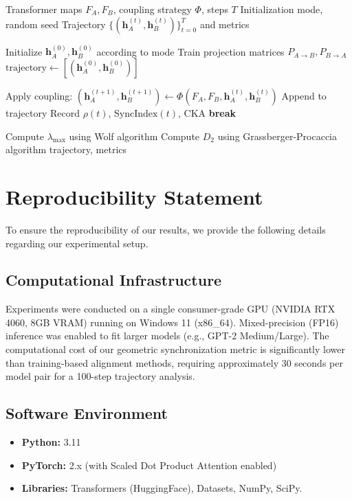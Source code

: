 \documentclass[10pt]{article} %
\theoremstyle{plain}
\theoremstyle{definition}
\theoremstyle{remark}
\newcommand{\vect}[1]{\bm{#1}}
\begin{document}
\begin{algorithm}[H]
\caption{Coupled Dynamics Test}
\label{alg:coupled}
\begin{algorithmic}[1]
\Require Transformer maps $F_A, F_B$, coupling strategy $\Phi$, steps $T$
\Require Initialization mode, random seed
\Ensure Trajectory $\{(\vect{h}_A^{(t)}, \vect{h}_B^{(t)})\}_{t=0}^T$ and metrics

\State Initialize $\vect{h}_A^{(0)}, \vect{h}_B^{(0)}$ according to mode
    \State Train projection matrices $P_{A \to B}, P_{B \to A}$
\EndIf
\State $\text{trajectory} \gets [(\vect{h}_A^{(0)}, \vect{h}_B^{(0)})]$

    \State Apply coupling: $(\vect{h}_A^{(t+1)}, \vect{h}_B^{(t+1)}) \gets \Phi(F_A, F_B, \vect{h}_A^{(t)}, \vect{h}_B^{(t)})$
    \State Append to trajectory
    \State Record $\rho(t)$, $\text{SyncIndex}(t)$, CKA
        \State \textbf{break}
    \EndIf
\EndFor

\State Compute $\lambda_{\max}$ using Wolf algorithm
\State Compute $D_2$ using Grassberger-Procaccia algorithm
\State \Return trajectory, metrics
\end{algorithmic}
\end{algorithm}

\section{Reproducibility Statement}
\label{app:reproducibility}

To ensure the reproducibility of our results, we provide the following details regarding our experimental setup.

\subsection{Computational Infrastructure}
Experiments were conducted on a single consumer-grade GPU (NVIDIA RTX 4060, 8GB VRAM) running on Windows 11 (x86\_64). Mixed-precision (FP16) inference was enabled to fit larger models (e.g., GPT-2 Medium/Large). The computational cost of our geometric synchronization metric is significantly lower than training-based alignment methods, requiring approximately 30 seconds per model pair for a 100-step trajectory analysis.

\subsection{Software Environment}
\begin{itemize}
    \item \textbf{Python:} 3.11
    \item \textbf{PyTorch:} 2.x (with Scaled Dot Product Attention enabled)
    \item \textbf{Libraries:} Transformers (HuggingFace), Datasets, NumPy, SciPy.
\end{itemize}
\end{document}
